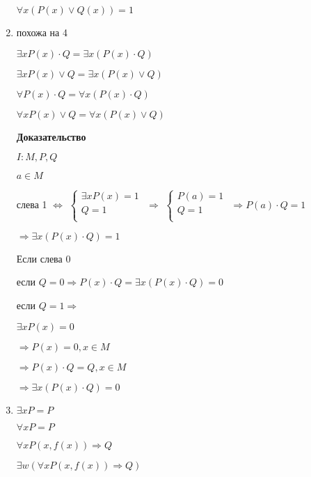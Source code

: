 \documentclass[russian]{lecture-notes}
\begin{document}
\begin{enumerate}
{\begin{remark}
                $\forall x (P(x) \lor Q(x)) = 1$
            \end{remark}

        }

        \item{
            похожа на 4

            $\exists x P(x) \cdot Q = \exists x (P(x) \cdot Q)$

            $\exists x P(x) \lor Q = \exists x (P(x) \lor Q)$

            $\forall P(x) \cdot Q = \forall x (P(x) \cdot Q)$

            $\forall x P(x) \lor Q = \forall x (P(x) \lor Q)$

            \textbf{Доказательство}

            $I: M, P, Q$

            $a \in M$

            слева 1 $\Leftrightarrow$
            $\left \{
            \begin{gathered}
                \exists x P(x) = 1 \\
                Q = 1 \\
            \end{gathered}
            \right.$
            $\Rightarrow$
            $\left \{
            \begin{gathered}
                P(a) = 1 \\
                Q = 1 \\
            \end{gathered}
            \right.$
            $\Rightarrow P(a) \cdot Q = 1$

            $\Rightarrow \exists x (P(x) \cdot Q) = 1$

            Если слева 0

            если $Q = 0 \Rightarrow P(x) \cdot Q = \exists x (P(x) \cdot Q) = 0$

            если $Q = 1 \Rightarrow$

            $\exists x P(x) = 0 $

            $\Rightarrow P(x) = 0, x \in M$

            $\Rightarrow P(x) \cdot Q = Q, x \in M $

            $\Rightarrow \exists x (P(x) \cdot Q) = 0$

        }

        \item{
            $\exists x P = P$

            $\forall x P = P$

            \begin{example}
                $\forall x P(x, f(x)) \Rightarrow Q$

                $\exists w (\forall x P(x, f(x)) \Rightarrow Q)$
            \end{example}
        }

    \end{enumerate}
\end{document}

